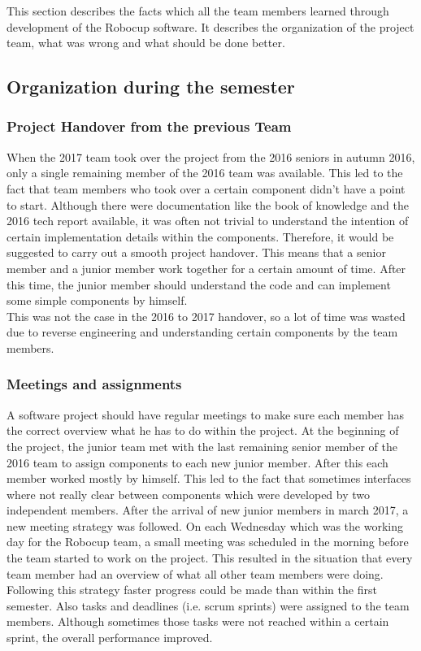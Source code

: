 This section describes the facts which all the team members learned through development of the Robocup software. It describes the organization of the 
project team, what was wrong and what should be done better.

\subsection{Organization during the semester}
 
\subsubsection{Project Handover from the previous Team}

When the 2017 team took over the project from the 2016 seniors in autumn 2016, only a single remaining member of the 2016 team was available. This led to the fact that team members who took over a certain component didn't have a point to start. Although there were documentation like the book of knowledge \cite{BOK} and the 2016 tech report available, it was often not trivial to understand the intention of certain implementation details within the components. Therefore, it would be suggested to carry out a smooth project handover. This means that a senior member and a junior member work together for a certain amount of time. After this time, the junior member should understand the code and can implement some simple components by himself. \\

This was not the case in the 2016 to 2017 handover, so a lot of time was wasted due to reverse engineering and understanding certain components by the team members. 
 
\subsubsection{Meetings and assignments}
 
A software project should have regular meetings to make sure each member has the correct overview what he has to do within the project. At the beginning of the project, the junior team met with the last remaining senior member of the 2016 team to assign components to each new junior member. After this each member worked mostly by himself. This led to the fact that sometimes interfaces where not really clear between components which were developed by two independent members. After the arrival of new junior members in march 2017, a new meeting strategy was followed. On each Wednesday which was the working day for the Robocup team, a small meeting was scheduled in the morning before the team started to work on the project. This resulted in the situation that every team member had an overview of what all other team members were doing. Following this strategy faster progress could be made than within the first semester. Also tasks and deadlines (i.e. scrum sprints) were assigned to the team members. Although sometimes those tasks were not reached within a certain sprint, the overall performance improved.


